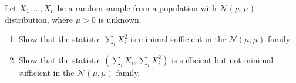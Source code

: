 
\begin{exercise}

Let $X_1,\dots,X_n$ be a random sample from a population with $\mathcal{N}(\mu,\mu)$
distribution, where $\mu > 0$ is unknown.

\begin{enumerate}[label = (\alph*)]
  \item Show that the statistic $\sum_i X_i^2$ is minimal sufficient
  in the $\mathcal{N}(\mu,\mu)$ family.
  \item Show that the statistic $(\sum_i X_i, \sum_i X_i^2)$ is sufficient
  but not minimal sufficient in the $\mathcal{N}(\mu,\mu)$ family.
\end{enumerate}

\end{exercise}


\begin{solution}

\phantom{}

\end{solution}


